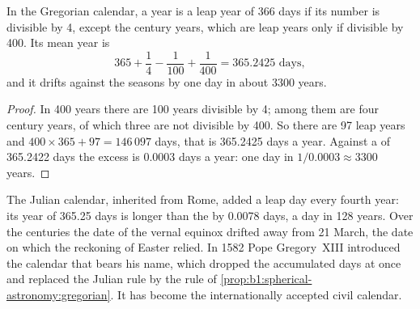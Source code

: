 \begin{proposition}\label{prop:b1:spherical-astronomy:gregorian}
In the Gregorian calendar, a year is a leap year of 366 days if its number is
divisible by 4, except the century years, which are leap years only if
divisible by 400. Its mean year is
\[
  365 + \frac14 - \frac1{100} + \frac1{400} = \num{365.2425}\text{ days},
\]
and it drifts against the seasons by one day in about 3300 years.
\end{proposition}

\begin{proof}
In 400 years there are 100 years divisible by 4; among them are four
century years, of which three are not divisible by 400. So there are 97 leap
years and $400\times 365 + 97 = 146\,097$ days,
that is 365.2425 days a year. Against a  of 365.2422 days the
excess is 0.0003 days a year: one day in $1/0.0003 \approx 3300$ years.
\end{proof}

\begin{history}
The Julian calendar, inherited from Rome, added a leap day every fourth
year: its year of 365.25 days is longer than the  by 0.0078
days, a day in 128 years. Over the centuries the date of the vernal equinox
drifted away from 21 March, the date on which the reckoning of Easter relied.
In 1582 Pope Gregory~XIII introduced the calendar that bears his name, which
dropped the accumulated days at once and replaced the Julian rule by the rule
of \cref{prop:b1:spherical-astronomy:gregorian}. It has become the
internationally accepted civil calendar.
\end{history}

